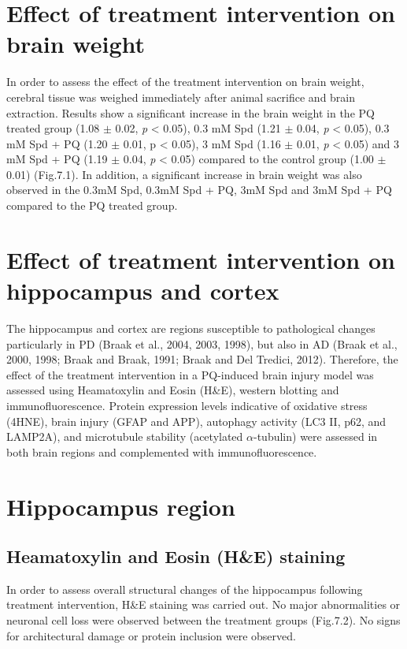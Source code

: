 \section{Effect of treatment intervention on brain weight}
In order to assess the effect of the treatment intervention on brain weight, cerebral tissue was weighed immediately after animal sacrifice and brain extraction. Results show a significant increase in the brain weight in the PQ treated group (1.08 $\pm$ 0.02, \textit{p} < 0.05), 0.3 mM Spd (1.21 $\pm$ 0.04, \textit{p} < 0.05), 0.3 mM Spd + PQ (1.20 $\pm$ 0.01, p < 0.05), 3 mM Spd (1.16 $\pm$ 0.01, \textit{p} < 0.05) and 3 mM Spd + PQ (1.19 $\pm$ 0.04, \textit{p} < 0.05) compared to the control group (1.00 $\pm$ 0.01) (Fig.7.1). In addition, a significant increase in brain weight was also observed in the 0.3mM Spd, 0.3mM Spd + PQ, 3mM Spd and 3mM Spd + PQ compared to the PQ treated group. 


\section{Effect of treatment intervention on hippocampus and cortex}
The hippocampus and cortex are regions susceptible to pathological changes particularly in PD (Braak et al., 2004, 2003, 1998), but also in AD (Braak et al., 2000, 1998; Braak and Braak, 1991; Braak and Del Tredici, 2012). Therefore, the effect of the treatment intervention in a PQ-induced brain injury model was assessed using Heamatoxylin and Eosin (H\&E), western blotting and immunofluorescence. Protein expression levels indicative of oxidative stress (4HNE), brain injury (GFAP and APP), autophagy activity (LC3 II, p62, and LAMP2A), and microtubule stability (acetylated $\alpha$-tubulin) were assessed in both brain regions and complemented with immunofluorescence.


\section{Hippocampus region}
\subsection{Heamatoxylin and Eosin (H\&E) staining}
In order to assess overall structural changes of the hippocampus following treatment intervention, H\&E staining was carried out. No major abnormalities or neuronal cell loss were observed between the treatment groups (Fig.7.2). No signs for architectural damage or protein inclusion were observed.

